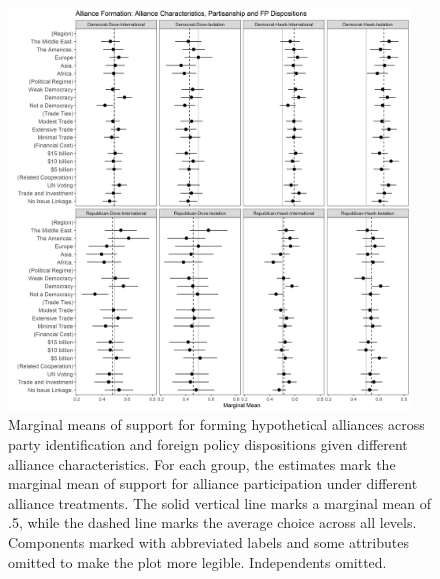 \documentclass[12pt]{article}
\begin{document}
\begin{figure}
	\centering
		\includegraphics[width=0.95\textwidth]{../figures/party-dispo-form-char.png}
	\caption{Marginal means of support for forming hypothetical alliances across party identification and foreign policy dispositions given different alliance characteristics. For each group, the estimates mark the marginal mean of support for alliance participation under different alliance treatments. The solid vertical line marks a marginal mean of .5, while the dashed line marks the average choice across all levels. Components marked with abbreviated labels and some attributes omitted to make the plot more legible. Independents omitted.}
	\label{fig:party-dispo-form-char}
\end{figure}
\end{document}
